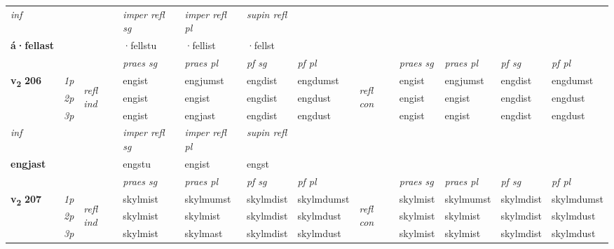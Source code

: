 \begin{longtable}[l]{X>{\footnotesize\itshape}llXXXXlXXXX}
   {\textit{inf}} & &   & \textit{imper refl sg} & \textit{imper refl pl}   & \textit{supin refl}  \\*
  {\textbf{á\allowbreak ·fellast}} & &   & ·fellstu & ·fellist   & ·fellst  \\*

\midrule

 & &   & \textit{praes sg}  & \textit{praes pl}    & \textit{ pf sg} & \textit{pf pl} & & \textit{praes sg}  & \textit{praes pl}    & \textit{pf sg} & \textit{pf pl }  \\ \cmidrule{4-7} \cmidrule{9-12}
 \multirow{2}{*}{{{\textbf{v{\textsubscript{2}}} \Large{\textbf{206}}}}}  & 1p & \multirow{3}{*}{\begin{turn}{90}\textit{refl ind}\end{turn}}  & engist & engjumst & engdist & engdumst & \multirow{3}{*}{\begin{turn}{90}\textit{refl con}\end{turn}}  &engist & engjumst & engdist & engdumst \\*
 & 2p &  & engist & engist & engdist & engdust & &engist & engist & engdist & engdust \\*
 & 3p  & & engist & engjast & engdist & engdust & & engist & engist& engdist & engdust \\*
\cmidrule{4-7} \cmidrule{9-12}

   {\textit{inf}} & &   & \textit{imper refl sg} & \textit{imper refl pl}   & \textit{supin refl}  \\*
  {\textbf{engjast}} & &   & engstu & engist   & engst  \\*

\midrule

 & &   & \textit{praes sg}  & \textit{praes pl}    & \textit{ pf sg} & \textit{pf pl} & & \textit{praes sg}  & \textit{praes pl}    & \textit{pf sg} & \textit{pf pl }  \\ \cmidrule{4-7} \cmidrule{9-12}
 \multirow{2}{*}{{{\textbf{v{\textsubscript{2}}} \Large{\textbf{207}}}}}  & 1p & \multirow{3}{*}{\begin{turn}{90}\textit{refl ind}\end{turn}}  & skylmist & skylmumst & skylmdist & skylmdumst & \multirow{3}{*}{\begin{turn}{90}\textit{refl con}\end{turn}}  &skylmist & skylmumst & skylmdist & skylmdumst \\*
 & 2p &  & skylmist & skylmist & skylmdist & skylmdust & &skylmist & skylmist & skylmdist & skylmdust \\*
 & 3p  & & skylmist & skylmast & skylmdist & skylmdust & & skylmist & skylmist& skylmdist & skylmdust \\*
\cmidrule{4-7} \cmidrule{9-12}


\end{longtable}
